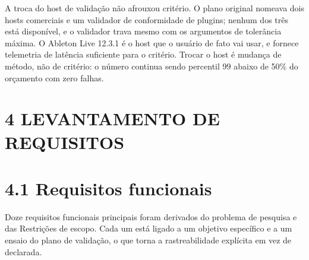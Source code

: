 \documentclass[12pt,a4paper]{article}
\begin{document}
A troca do host de validação não afrouxou critério. O plano original nomeava dois hosts comerciais e um validador de conformidade de plugins; nenhum dos três está disponível, e o validador trava mesmo com os argumentos de tolerância máxima. O Ableton Live 12.3.1 é o host que o usuário de fato vai usar, e fornece telemetria de latência suficiente para o critério. Trocar o host é mudança de método, não de critério: o número continua sendo percentil 99 abaixo de 50\% do orçamento com zero falhas.


\section*{4 LEVANTAMENTO DE REQUISITOS}

\section*{4.1 Requisitos funcionais}

Doze requisitos funcionais principais foram derivados do problema de pesquisa e das Restrições de escopo. Cada um está ligado a um objetivo específico e a um ensaio do plano de validação, o que torna a rastreabilidade explícita em vez de declarada.
\end{document}
